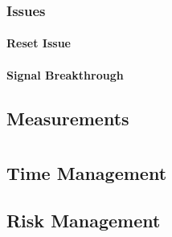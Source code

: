 \subsection{Issues}

\subsubsection{ Reset Issue}

\subsubsection{Signal Breakthrough}

\section{Measurements}

\chapter{}



\section{Time Management}

\clearpage
\begin{landscape}

\end{landscape}

\section{Risk Management}

\chapter{}